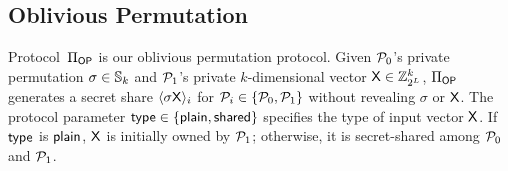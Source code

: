 \fi

\subsection{Oblivious Permutation}
\label{sec::op_pro}
Protocol~$\Pi_{\mathsf{OP}}$
is our oblivious permutation protocol.
Given $\mathcal{P}_0$'s private permutation $\sigma\in\mathbb{S}_k$ and $\mathcal{P}_1$'s private $k$-dimensional vector $\mathsf{X}\in\mathbb{Z}^k_{2^L}$, $\Pi_{\mathsf{OP}}$ generates a secret share $\langle \sigma\mathsf{X} \rangle_i$ for $\mathcal{P}_i \in \{\mathcal{P}_0, \mathcal{P}_1\}$ without revealing $\sigma$ or $\mathsf{X}$.
The protocol parameter $\mathsf{type} \in \{\mathsf{plain}, \mathsf{shared}\}$ specifies the type of input vector $\mathsf{X}$.
If $\mathsf{type}$ is $\mathsf{plain}$, $\mathsf{X}$ is initially owned by $\mathcal{P}_1$; otherwise, it is secret-shared among $\mathcal{P}_0$ and $\mathcal{P}_1$.

